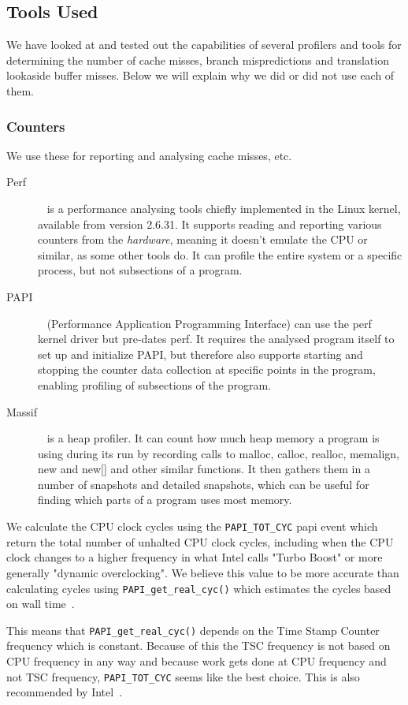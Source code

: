 \subsection{Tools Used}
We have looked at and tested out the capabilities of several profilers and tools for determining the number of cache misses, branch mispredictions and translation lookaside buffer misses.
Below we will explain why we did or did not use each of them.


\subsubsection{Counters}
We use these for reporting and analysing cache misses, etc.
\begin{description}
\item[Perf]~\citep{perftool} is a performance analysing tools chiefly implemented in the Linux kernel, available from version 2.6.31.
It supports reading and reporting various counters from the \textit{hardware}, meaning it doesn't emulate the CPU or similar, as some other tools do.
It can profile the entire system or a specific process, but not subsections of a program.
\item[PAPI]~\citep{PAPI} (Performance Application Programming Interface) can use the perf kernel driver but pre-dates perf.
It requires the analysed program itself to set up and initialize PAPI, but therefore also supports starting and stopping the counter data collection at specific points in the program, enabling profiling of subsections of the program.
\item[Massif]~\citep{massif} is a heap profiler. It can count how much heap memory a program is using during its run by recording calls to malloc, calloc, realloc, memalign, new and new[] and other similar functions.
It then gathers them in a number of snapshots and detailed snapshots, which can be useful for finding which parts of a program uses most memory.
\end{description}
We calculate the CPU clock cycles using the \texttt{PAPI\_TOT\_CYC} papi event which return the total number of unhalted CPU clock cycles, including when the CPU clock changes to a higher frequency in what Intel calls "Turbo Boost" or more generally "dynamic overclocking".
We believe this value to be more accurate than calculating cycles using \texttt{PAPI\_get\_real\_cyc()} which estimates the cycles based on wall time~\citep{PAPI-get-real-cyc}. 

This means that \texttt{PAPI\_get\_real\_cyc()} depends on the Time Stamp Counter frequency which is constant. 
Because of this the TSC frequency is not based on CPU frequency in any way and because work gets done at CPU frequency and not TSC frequency, \texttt{PAPI\_TOT\_CYC} seems like the best choice. 
This is also recommended by Intel~\citep{IntelMeasuringTheAverageUnhaltedFrequency}.

